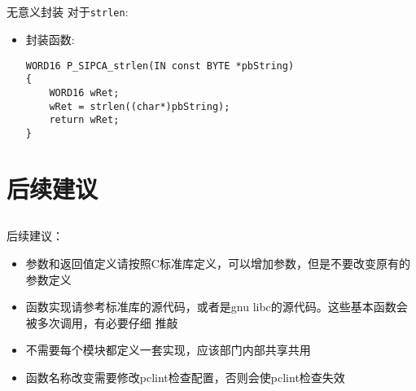﻿\documentclass[hyperref={bookmarks=ture}xcolor=pdflatex,svgnames,table,compress]{beamer}
\begin{document}
\subsection{}
\begin{frame}[containsverbatim]{无意义封装}
对于\lstinline{strlen}:

\begin{itemize}
    \item 封装函数:
\begin{lstlisting}
WORD16 P_SIPCA_strlen(IN const BYTE *pbString)
{
    WORD16 wRet;
    wRet = strlen((char*)pbString);
    return wRet;
}
\end{lstlisting}
\end{itemize}
\end{frame}

\section{后续建议}
\subsection{}
\begin{frame}
后续建议：
\begin{itemize}
    \item 参数和返回值定义请按照C标准库定义，可以增加参数，但是不要改变原有的参数定义
    \item 函数实现请参考标准库的源代码，或者是gnu libc的源代码。这些基本函数会被多次调用，有必要仔细
      推敲
    \item 不需要每个模块都定义一套实现，应该部门内部共享共用
    \item 函数名称改变需要修改pclint检查配置，否则会使pclint检查失效
\end{itemize}
\end{frame}
\end{document}
